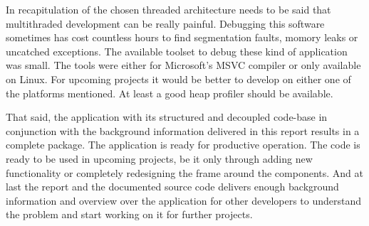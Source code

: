 In recapitulation of the chosen threaded architecture needs to be said that multithraded development can be really painful. Debugging this software sometimes has cost countless hours to find segmentation faults, momory leaks or uncatched exceptions. The available toolset to debug these kind of application was small. The tools were either for Microsoft's MSVC compiler or only available on Linux. For upcoming projects it would be better to develop on either one of the platforms mentioned. At least a good heap profiler should be available.

That said, the application with its structured and decoupled code-base in conjunction with the background information delivered in this report results in a complete package. The application is ready for productive operation. The code is ready to be used in upcoming projects, be it only through adding new functionality or completely redesigning the frame around the components. And at last the report and the documented source code delivers enough background information and overview over the application for other developers to understand the problem and start working on it for further projects.  

